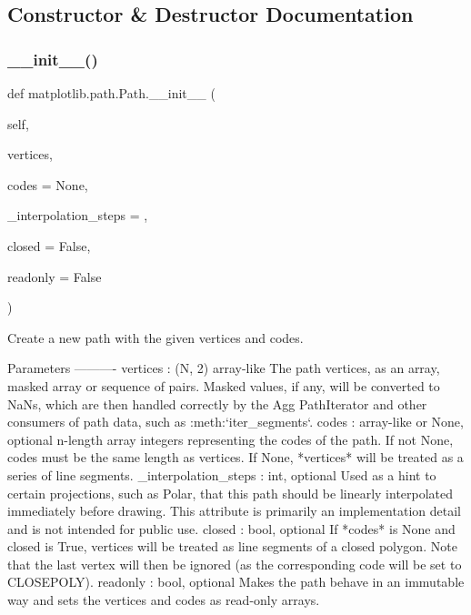 \subsection{Constructor \& Destructor Documentation}
\mbox{\label{classmatplotlib_1_1path_1_1Path_af8e0afa74a11ecee7181f3a873fa9428}} 
\subsubsection{\texorpdfstring{\+\_\+\+\_\+init\+\_\+\+\_\+()}{\_\_init\_\_()}}
{\footnotesize\ttfamily def matplotlib.\+path.\+Path.\+\_\+\+\_\+init\+\_\+\+\_\+ (\begin{DoxyParamCaption}\item[{}]{self,  }\item[{}]{vertices,  }\item[{}]{codes = {\ttfamily None},  }\item[{}]{\+\_\+interpolation\+\_\+steps = {},  }\item[{}]{closed = {\ttfamily False},  }\item[{}]{readonly = {\ttfamily False} }\end{DoxyParamCaption})}

\begin{DoxyVerb}Create a new path with the given vertices and codes.

Parameters
----------
vertices : (N, 2) array-like
    The path vertices, as an array, masked array or sequence of pairs.
    Masked values, if any, will be converted to NaNs, which are then
    handled correctly by the Agg PathIterator and other consumers of
    path data, such as :meth:`iter_segments`.
codes : array-like or None, optional
    n-length array integers representing the codes of the path.
    If not None, codes must be the same length as vertices.
    If None, *vertices* will be treated as a series of line segments.
_interpolation_steps : int, optional
    Used as a hint to certain projections, such as Polar, that this
    path should be linearly interpolated immediately before drawing.
    This attribute is primarily an implementation detail and is not
    intended for public use.
closed : bool, optional
    If *codes* is None and closed is True, vertices will be treated as
    line segments of a closed polygon.  Note that the last vertex will
    then be ignored (as the corresponding code will be set to
    CLOSEPOLY).
readonly : bool, optional
    Makes the path behave in an immutable way and sets the vertices
    and codes as read-only arrays.
\end{DoxyVerb}
 

